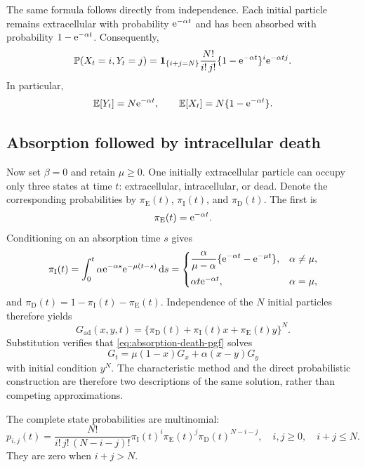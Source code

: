 The same formula follows directly from independence.  Each initial particle remains extracellular with probability $\mathrm{e}^{-\alpha t}$ and has been absorbed with probability $1-\mathrm{e}^{-\alpha t}$.  Consequently,
\begin{equation}
  \mathbb{P}(X_t=i,Y_t=j)
  =\mathbf{1}_{\{i+j=N\}}
   \frac{N!}{i!\,j!}
   \{1-\mathrm{e}^{-\alpha t}\}^{i}
   \mathrm{e}^{-\alpha t j}.
  \label{eq:absorption-state-probability}
\end{equation}
In particular,
\[
  \mathbb{E}[Y_t]=N\mathrm{e}^{-\alpha t},
  \qquad
  \mathbb{E}[X_t]=N\{1-\mathrm{e}^{-\alpha t}\}.
\]

\subsection{Absorption followed by intracellular death}
\label{sec:absorption-death}

Now set $\beta=0$ and retain $\mu\ge0$.  One initially extracellular particle can occupy only three states at time $t$: extracellular, intracellular, or dead.  Denote the corresponding probabilities by $\pi_{\mathrm{E}}(t)$, $\pi_{\mathrm{I}}(t)$, and $\pi_{\mathrm{D}}(t)$.  The first is
\[
  \pi_{\mathrm{E}}(t)=\mathrm{e}^{-\alpha t}.
\]
Conditioning on an absorption time $s$ gives
\begin{equation}
  \pi_{\mathrm{I}}(t)
  =\int_0^t \alpha\mathrm{e}^{-\alpha s}
              \mathrm{e}^{-\mu(t-s)}\,\mathrm{d} s
  =
  \begin{cases}
    \displaystyle
    \frac{\alpha}{\mu-\alpha}
      \{\mathrm{e}^{-\alpha t}-\mathrm{e}^{-\mu t}\},
      & \alpha\ne\mu,\\[3mm]
    \alpha t\mathrm{e}^{-\alpha t},
      & \alpha=\mu,
  \end{cases}
  \label{eq:absorption-death-intracellular}
\end{equation}
and $\pi_{\mathrm{D}}(t)=1-\pi_{\mathrm{I}}(t)-\pi_{\mathrm{E}}(t)$.  Independence of the $N$ initial particles therefore yields
\begin{equation}
  G_{\mathrm{ad}}(x,y,t)
  =\{\pi_{\mathrm{D}}(t)+\pi_{\mathrm{I}}(t)x+\pi_{\mathrm{E}}(t)y\}^{N}.
  \label{eq:absorption-death-pgf}
\end{equation}
Substitution verifies that \cref{eq:absorption-death-pgf} solves
\[
  G_t=\mu(1-x)G_x+\alpha(x-y)G_y
\]
with initial condition $y^N$.  The characteristic method and the direct probabilistic construction are therefore two descriptions of the same solution, rather than competing approximations.

The complete state probabilities are multinomial:
\begin{equation}
  p_{i,j}(t)
  =\frac{N!}{i!\,j!\,(N-i-j)!}
    \pi_{\mathrm{I}}(t)^i
    \pi_{\mathrm{E}}(t)^j
    \pi_{\mathrm{D}}(t)^{N-i-j},
  \quad
  i,j\ge0,\quad i+j\le N.
  \label{eq:absorption-death-state-probability}
\end{equation}
They are zero when $i+j>N$.

